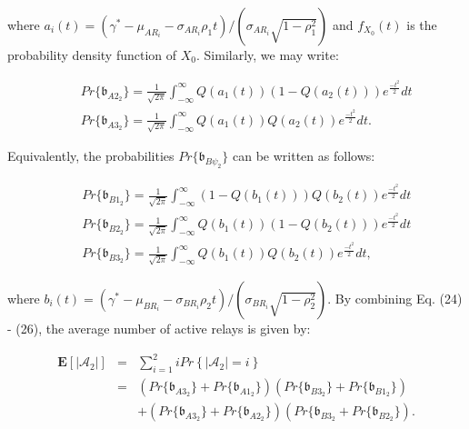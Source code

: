 \documentclass[12pt,draftcls, onecolumn]{IEEEtran}
\begin{document}
\noindent where $a_{i}(t) = \left(\gamma^*- \mu_{AR_{i}}-\sigma_{AR_{i}} \rho_1 t\right)/\left(\sigma_{AR_{i}}\sqrt{1-\rho^2_1}\right)$ and $f_{X_0}\left(t\right)$ is the probability density function of $X_0$. Similarly, we may write:

\begingroup
{\setlength{\arraycolsep}{0em}
\begin{eqnarray}
&&Pr\{\mathfrak{b}_{A2_2}\} = \frac{1}{\sqrt{2\pi}}\int^{\infty}_{-\infty}Q\left(a_{1}\left(t\right)\right)\left(1 - Q\left(a_{2}\left(t\right)\right)\right)e^{\frac{-t^2}{2}}dt \label{A2}\\
&&Pr\{\mathfrak{b}_{A3_2}\} = \frac{1}{\sqrt{2\pi}}\int^{\infty}_{-\infty}Q\left(a_{1}\left(t\right)\right)Q\left(a_{2}\left(t\right)\right)e^{\frac{-t^2}{2}}dt. \label{A3}
\end{eqnarray}}
\endgroup

\noindent Equivalently, the probabilities $Pr\{\mathfrak{b}_{B\psi_2}\}$ can be written as follows:

\begingroup
{\setlength{\arraycolsep}{0em}
\begin{eqnarray}
&&Pr\{\mathfrak{b}_{B1_2}\} = \frac{1}{\sqrt{2\pi}}\int^{\infty}_{-\infty}\left(1-Q\left(b_{1}\left(t\right)\right)\right) Q\left(b_{2}\left(t\right)\right)e^{\frac{-t^2}{2}}dt \label{B1}\\
&&Pr\{\mathfrak{b}_{B2_2}\} = \frac{1}{\sqrt{2\pi}}\int^{\infty}_{-\infty}Q\left(b_{1}\left(t\right)\right)\left(1 - Q\left(b_{2}\left(t\right)\right)\right)e^{\frac{-t^2}{2}}dt \label{B2}\\
&&Pr\{\mathfrak{b}_{B3_2}\} = \frac{1}{\sqrt{2\pi}}\int^{\infty}_{-\infty}Q\left(b_{1}\left(t\right)\right)Q\left(b_{2}\left(t\right)\right)e^{\frac{-t^2}{2}}dt, \label{B3}
\end{eqnarray}}
\endgroup

\noindent where $b_{i}(t) = \left(\gamma^*- \mu_{BR_{i}}-\sigma_{BR_{i}} \rho_2 t\right)/\left(\sigma_{BR_{i}}\sqrt{1-\rho^2_2}\right)$. By combining Eq. (24) - (26), the average number of active relays is given by:

\begingroup
\begin{eqnarray}
\label{eq:E-3}
\mathbf{E}\left[\left|\mathcal{A}_2\right|\right] &=& \sum^2_{i=1} iPr\left\{\left|\mathcal{A}_2\right|=i\right\}\nonumber\\
&=& \left(Pr\{\mathfrak{b}_{A3_2}\} + Pr\{\mathfrak{b}_{A1_2}\}\right)\left(Pr\{\mathfrak{b}_{B3_2}\}+Pr\{\mathfrak{b}_{B1_2}\}\right) \nonumber\\
&&+ \left(Pr\{\mathfrak{b}_{A3_2}\} + Pr\{\mathfrak{b}_{A2_2}\}\right)\left(Pr\{\mathfrak{b}_{B3_2}+Pr\{\mathfrak{b}_{B2_2}\}\right). \label{average}
\end{eqnarray}
\endgroup
\end{document}
